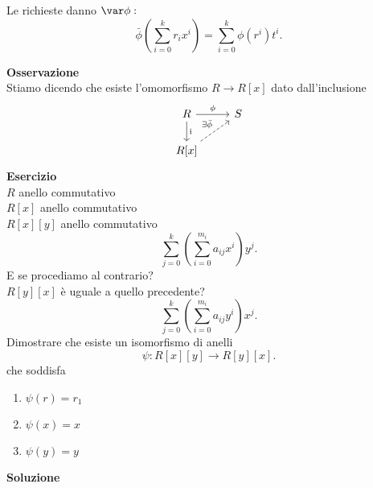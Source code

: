 \documentclass[12px]{article}
\begin{document}
\begin{dimo}
	Le richieste danno $\var\phi:$
	 \[
		 \bar\phi \left( \sum^{k}_{i=0}r_ix^i \right) = \sum^{k}_{i=0}\phi(r^i)t^i
	.\] 
\end{dimo}
\textbf{Osservazione}\\
Stiamo dicendo che esiste l'omomorfismo $R \rightarrow R[x]$ dato dall'inclusione
\[
\begin{tikzcd}
R \arrow[r, "\phi"] \arrow[d, " \text{i} "] & S \\
R[x] \arrow[ru, "\exists \bar{\phi}", dashed]
\end{tikzcd}
\]
\textbf{Esercizio}\\
$R$ anello commutativo\\
$R[x]$ anello commutativo\\
$R[x][y]$ anello commutativo\\
\[
	\sum^{k}_{j=0} \left( \sum^{m_i}_{i =0}a_{ij}x^i \right)y^j
.\] 
E se procediamo al contrario?\\
$R[y][x]$ è uguale a quello precedente?\\
\[
	\sum^{k}_{j=0} \left( \sum^{m_i}_{i =0}a_{ij}y^i \right)x^j
.\] 
Dimostrare che esiste un isomorfismo di anelli 
\[
	\psi :R[x][y] \rightarrow R[y][x]
.\] 
che soddisfa
\begin{enumerate}
	\item $\psi(r) = r_1$
	\item $\psi(x) = x$
	\item  $\psi(y) = y$
\end{enumerate}
\textbf{Soluzione}\\
\begin{center}
\end{center}
\end{document}
